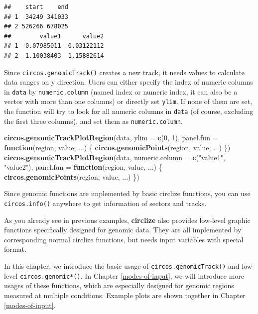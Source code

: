 \documentclass[]{book}
\newenvironment{Shaded}{\begin{snugshade}}{\end{snugshade}}
\newcommand{\KeywordTok}[1]{\textcolor[rgb]{0.13,0.29,0.53}{\textbf{#1}}}
\newcommand{\DataTypeTok}[1]{\textcolor[rgb]{0.13,0.29,0.53}{#1}}
\newcommand{\DecValTok}[1]{\textcolor[rgb]{0.00,0.00,0.81}{#1}}
\newcommand{\StringTok}[1]{\textcolor[rgb]{0.31,0.60,0.02}{#1}}
\newcommand{\ControlFlowTok}[1]{\textcolor[rgb]{0.13,0.29,0.53}{\textbf{#1}}}
\newcommand{\NormalTok}[1]{#1}
\theoremstyle{definition}
\theoremstyle{definition}
\theoremstyle{remark}
\begin{document}
\begin{verbatim}
##    start    end
## 1  34249 341033
## 2 526266 678025
##        value1      value2
## 1 -0.07985011 -0.03122112
## 2 -1.10038403  1.15882614
\end{verbatim}

Since \texttt{circos.genomicTrack()} creates a new track, it needs
values to calculate data ranges on y direction. Users can either specify
the index of numeric columns in \texttt{data} by \texttt{numeric.column}
(named index or numeric index, it can also be a vector with more than
one columns) or directly set \texttt{ylim}. If none of them are set, the
function will try to look for all numeric columns in \texttt{data} (of
course, excluding the first three columns), and set them as
\texttt{numeric.column}.

\begin{Shaded}
\begin{Highlighting}[]
\KeywordTok{circos.genomicTrackPlotRegion}\NormalTok{(data, }\DataTypeTok{ylim =} \KeywordTok{c}\NormalTok{(}\DecValTok{0}\NormalTok{, }\DecValTok{1}\NormalTok{),}
    \DataTypeTok{panel.fun =} \ControlFlowTok{function}\NormalTok{(region, value, ...) \{}
        \KeywordTok{circos.genomicPoints}\NormalTok{(region, value, ...)}
\NormalTok{\})}
\KeywordTok{circos.genomicTrackPlotRegion}\NormalTok{(data, }\DataTypeTok{numeric.column =} \KeywordTok{c}\NormalTok{(}\StringTok{"value1"}\NormalTok{, }\StringTok{"value2"}\NormalTok{), }
    \DataTypeTok{panel.fun =} \ControlFlowTok{function}\NormalTok{(region, value, ...) \{}
        \KeywordTok{circos.genomicPoints}\NormalTok{(region, value, ...)}
\NormalTok{\})}
\end{Highlighting}
\end{Shaded}

Since genomic functions are implemented by basic circlize functions, you
can use \texttt{circos.info()} anywhere to get information of sectors
and tracks.

As you already see in previous examples, \textbf{circlize} also provides
low-level graphic functions specifically designed for genomic data. They
are all implemented by corresponding normal circlize functions, but
needs input variables with special format.

In this chapter, we introduce the basic usage of
\texttt{circos.genomicTrack()} and low-level \texttt{circos.genomic*()}.
In Chapter \ref{modes-of-input}, we will introduce more usages of these
functions, which are especially designed for genomic regions measured at
multiple conditions. Example plots are shown together in Chapter
\ref{modes-of-input}.
\end{document}
